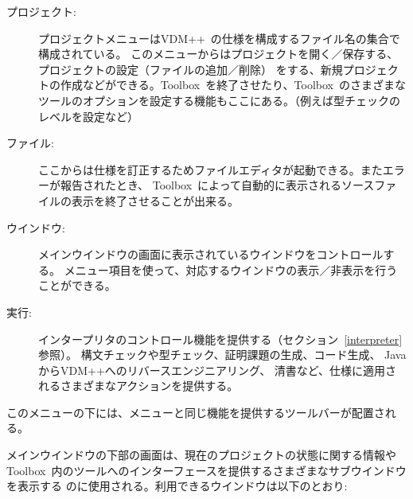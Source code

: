\documentclass[\pformat,12pt]{jarticle}
\newcommand{\vdmslpp}{VDM++}
\newcommand{\Toolbox}{Toolbox}
\newcommand{\guicmd}[1]{{\gt #1}}
\begin{document}
\begin{description}
\item[\guicmd{プロジェクト}:]
  プロジェクトメニューは\vdmslpp\ の仕様を構成するファイル名の集合で構成されている。
  このメニューからはプロジェクトを開く／保存する、プロジェクトの設定（ファイルの追加／削除）
  をする、新規プロジェクトの作成などができる。\Toolbox\ を終了させたり、\Toolbox\ のさまざまな
  ツールのオプションを設定する機能もここにある。（例えば型チェックのレベルを設定など）

\item[\guicmd{ファイル}:]
  ここからは仕様を訂正するためファイルエディタが起動できる。またエラーが報告されたとき、
  \Toolbox\ によって自動的に表示されるソースファイルの表示を終了させることが出来る。

\item[\guicmd{ウインドウ}:]
  メインウインドウの画面に表示されているウインドウをコントロールする。
  メニュー項目を使って、対応するウインドウの表示／非表示を行うことができる。

\item[\guicmd{実行}:]
  インタープリタのコントロール機能を提供する（セクション~\ref{interpreter}参照）。
  構文チェックや型チェック、証明課題の生成、コード生成、
JavaからVDM++へのリバースエンジニアリング、
  清書など、仕様に適用されるさまざまなアクションを提供する。

\end{description}

  このメニューの下には、メニューと同じ機能を提供するツールバーが配置される。
  
  メインウインドウの下部の画面は、現在のプロジェクトの状態に関する情報や
  \Toolbox\ 内のツールへのインターフェースを提供するさまざまなサブウインドウを表示する
  のに使用される。利用できるウインドウは以下のとおり:
\end{document}
